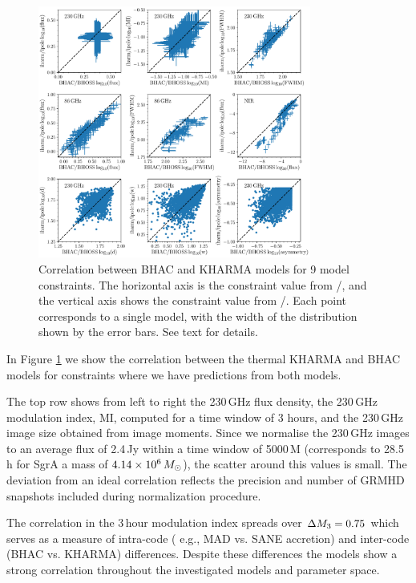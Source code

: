 \begin{figure}
  \centering
  \includegraphics[width=0.8\textwidth]{./figures/BHAC_iharm_correlation}
  \caption{Correlation between BHAC and KHARMA models for 9 model constraints.  The horizontal axis is the constraint value from \bhac/\bhoss, and the vertical axis shows the constraint value from \kharma/\ipole.  Each point corresponds to a single model, with the width of the distribution shown by the error bars.  See text for details.}
  \label{fig:modelcorrelation}
\end{figure}

In Figure \ref{fig:modelcorrelation} we show the correlation between the thermal KHARMA and BHAC models for constraints where we have predictions from both models.

The top row shows from left to right the 230\,GHz flux density, the 230\,GHz modulation index, MI, computed for a time window of 3 hours, and the 230\,GHz image size obtained from image moments. Since we normalise the 230\,GHz images to an average flux of 2.4\,Jy within a time window of 5000\,M (corresponds to 28.5 h for SgrA a mass of $4.14\times 10^6\,M_\odot$), the scatter around this values is small. The deviation from an ideal correlation reflects the precision and number of GRMHD snapshots included during normalization procedure.

The correlation in the 3\,hour modulation index spreads over $\Delta M_{3}=0.75$ which serves as a measure of intra-code ( e.g., MAD vs. SANE accretion) and inter-code (BHAC vs. KHARMA) differences. Despite these differences the models show a strong correlation throughout the investigated models and parameter space.

